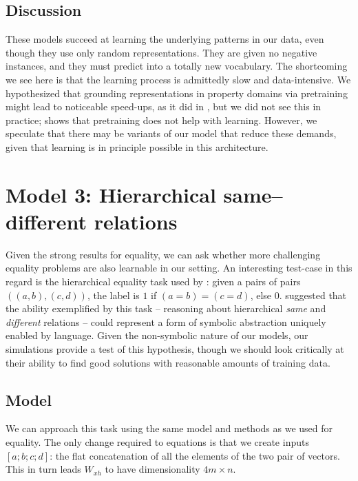 \documentclass[9pt,twocolumn,twoside,lineno]{pnas-new}
\newcommand{\update}[1]{{\color{darkblue}#1}}
\begin{document}
\subsection*{Discussion}

These models succeed at learning the underlying patterns in our data, even though they use only random representations.  They are given no negative instances, and they must predict into a totally new vocabulary. \update{The shortcoming we see here is that the learning process is admittedly slow and data-intensive. We hypothesized that grounding representations in property domains via pretraining might lead to noticeable speed-ups, as it did in \secref{sec:equality}, but we did not see this in practice;  \figref{fig:fuzzy-lm-pretrain-results} shows that pretraining does not help with learning.} However, we speculate that there may be variants of our model that reduce these demands, given that learning is in principle possible in this architecture.


\section*{Model 3: Hierarchical same--different relations}\label{sec:premack}

Given the strong results for equality, we can ask whether more challenging equality problems are also learnable in our setting. An interesting test-case in this regard is the hierarchical equality task used by \citet{Premack:1983}: given a pairs of pairs $((a,b), (c,d))$, the label is $1$ if $(a = b) = (c = d)$, else $0$.  \citet{Premack:1983} suggested that the ability exemplified by this task -- reasoning about hierarchical \emph{same} and \emph{different} relations -- could represent a form of symbolic abstraction uniquely enabled by language.  Given the non-symbolic nature of our models, our simulations provide a test of this hypothesis, though we should look critically at their ability to find good solutions with reasonable amounts of training data.


\subsection*{Model}

We can approach this task using the same model and methods as we used for equality. The only change required to equations  is that we create inputs $[a;b;c;d]$: the flat concatenation of all the elements of the two pair of vectors. This in turn leads $W_{xh}$ to have dimensionality $4m \times n$.
\end{document}
